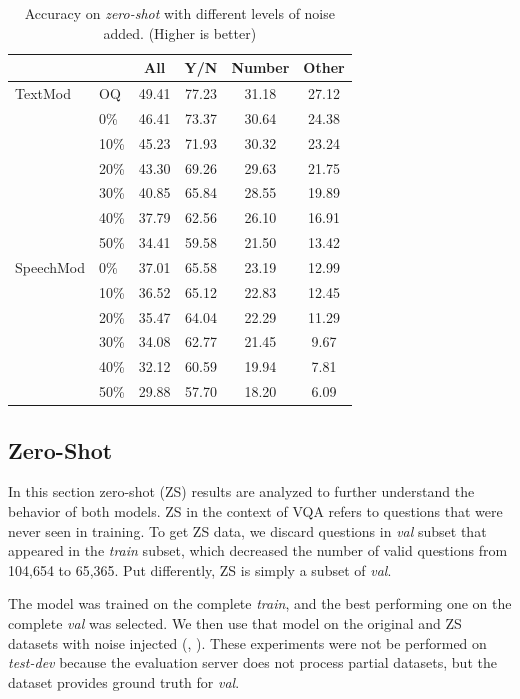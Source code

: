 \documentclass[letterpaper]{article} %
\begin{document}
\begin{table}[t]
\centering
\caption{Accuracy on \textit{zero-shot} with different levels of noise added. (Higher is better)}
\label{table:zs}
\begin{tabular}{ll|cccc}
          &                     & All    & Y/N    & Number & Other \\ \hline
TextMod   & OQ                  & 49.41  & 77.23  & 31.18  & 27.12 \\
          & 0\%                 & 46.41  & 73.37  & 30.64  & 24.38 \\
          & 10\%                & 45.23  & 71.93  & 30.32  & 23.24 \\
          & 20\%                & 43.30  & 69.26  & 29.63  & 21.75 \\
          & 30\%                & 40.85  & 65.84  & 28.55  & 19.89 \\
          & 40\%                & 37.79  & 62.56  & 26.10  & 16.91 \\
          & 50\%                & 34.41  & 59.58  & 21.50  & 13.42 \\ \hline
SpeechMod & 0\%                 & 37.01  & 65.58  & 23.19  & 12.99 \\
          & 10\%                & 36.52  & 65.12  & 22.83  & 12.45 \\
          & 20\%                & 35.47  & 64.04  & 22.29  & 11.29 \\
          & 30\%                & 34.08  & 62.77  & 21.45  &  9.67 \\
          & 40\%                & 32.12  & 60.59  & 19.94  &  7.81 \\
          & 50\%                & 29.88  & 57.70  & 18.20  &  6.09 
\end{tabular}
\end{table}


\subsection{Zero-Shot}
In this section zero-shot (ZS) results are analyzed to further understand the behavior of both models. ZS in the context of VQA refers to questions that were never seen in training. To get ZS data, we discard questions in \textit{val} subset that appeared in the \textit{train} subset, which decreased the number of valid questions from 104,654 to 65,365. Put differently, ZS is simply a subset of \textit{val}.

The model was trained on the complete \textit{train}, and the best performing one on the complete \textit{val} was selected.
We then use that model on the original and ZS datasets with noise injected (, ).
These experiments were not be performed on \textit{test-dev} because the evaluation server does not process partial datasets, but the dataset provides ground truth for \textit{val}.
\end{document}
